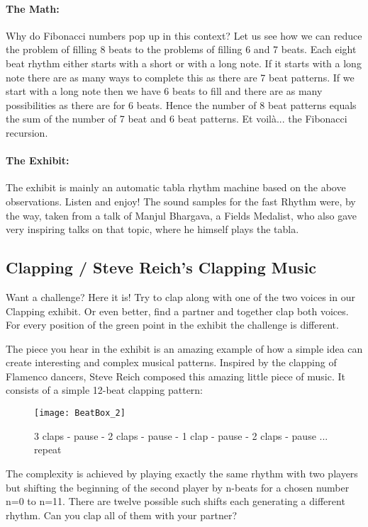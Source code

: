 \paragraph{The Math:}
Why do Fibonacci numbers pop up in this context? Let us see how we can reduce the problem of filling 8 beats to the problems of filling 6 and 7 beats. Each eight beat rhythm either starts with a short or with a long note. If it starts with a long note there are as many ways to complete this as there are 7 beat patterns. If we start with a long  note then we have 6 beats to fill and there are as many possibilities as there are for 6 beats. Hence the number of 8 beat patterns equals the sum of the number of 7 beat and 6 beat patterns. Et voilà... the Fibonacci recursion.

\paragraph{The Exhibit:} The exhibit is mainly an automatic tabla rhythm machine based on the above observations. Listen and enjoy! The sound samples for the fast Rhythm were, by the way, taken from a talk of Manjul Bhargava, a Fields Medalist, who also gave very inspiring talks on that topic, where he himself plays the tabla.

\subsection{Clapping / Steve Reich's Clapping Music}
Want a challenge? Here it is! Try to clap along with one of the two voices in our Clapping exhibit. Or even better, find a partner and together clap both voices. For every position of the green point in the exhibit the challenge is different.

The piece you hear in the exhibit is an amazing example of how a simple idea can create interesting and complex musical patterns. Inspired by the clapping of Flamenco dancers, Steve Reich composed this amazing little piece of music. It consists of a simple 12-beat clapping pattern:

\begin{figure}[h]
\centering
\texttt{[image: BeatBox\_2]}
\caption*{3 claps - pause - 2 claps - pause - 1 clap - pause - 2 claps - pause ... repeat}
\end{figure}


The complexity is achieved by playing exactly the same rhythm with two players but shifting the beginning of the second player by n-beats for a chosen number n=0 to n=11. There are twelve possible such shifts each generating a different rhythm. Can you clap all of them with your partner?

